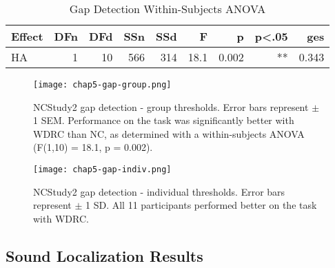 \begin{table}[htp]
\begin{center}
\begin{tabular}{lrrrrrrrr}
       Effect & DFn & DFd  &  SSn &  SSd  &    F  &     p & p<.05  &   ges
       \\
       \hline
          HA &  1 & 10  & 566 & 314 & 18.1 & 0.002   &  ** & 0.343 \\
      \hline
\end{tabular}
\end{center}
\caption{Gap Detection Within-Subjects ANOVA}
\end{table}

\begin{figure}[htp]
\begin{center}
\texttt{[image: chap5-gap-group.png]} \\
\caption[NCStudy2 gap detection - group thresholds]{NCStudy2 gap detection - group thresholds.  Error bars represent $\pm$ 1 SEM.  Performance on the task was significantly better with WDRC than NC, as determined with a within-subjects ANOVA (F(1,10) = 18.1, p = 0.002).}
\label{chap5-gap-group}
\end{center}
\end{figure}

\begin{figure}[htp]
\begin{center}
\texttt{[image: chap5-gap-indiv.png]} \\
\caption[NCStudy2 gap detection - individual thresholds]{NCStudy2 gap detection - individual thresholds.  Error bars represent $\pm$ 1 SD.  All 11 participants performed better on the task with WDRC.}
\label{chap5-gap-indiv}
\end{center}
\end{figure}

\subsection{Sound Localization Results}
